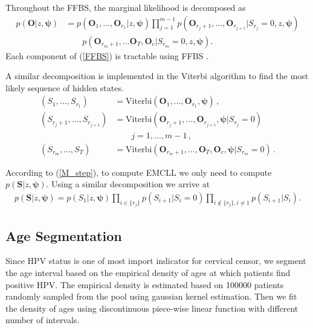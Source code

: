 \documentclass{article}
\begin{document}
Throughout the FFBS, the marginal likelihood is decomposed as
\begin{align}
p(\bm O |z, \bm \psi) & = p(\bm O_1, \ldots, \bm O_{r_1}| z, \bm \psi) \prod_{j = 1}^{m-1}p(\bm O_{r_j+1}, \ldots, \bm O_{r_{j+1}}| S_{r_j} = 0, z, \bm \psi) \nonumber \\
& \qquad p(\bm O_{r_m+1}, \ldots \bm O_T, \bm O_{c}| S_{r_m} = 0, z, \bm \psi). 
\label{FFBS}
\end{align}
Each component of (\ref{FFBS}) is tractable using FFBS \cite{Kitagawa_1987}.

A similar decomposition is implemented in the Viterbi algorithm to find the most likely sequence of hidden states.
\begin{align}
(S_1, \ldots, S_{r_1}) & = \mathrm{Viterbi}(\bm O_1, \ldots, \bm O_{r_1}, \bm \psi)\,, \nonumber \\
(S_{r_j+1}, \ldots, S_{r_{j+1}}) & = \mathrm{Viterbi}(\bm O_{r_j+1}, \ldots, \bm O_{r_{j+1}}, \bm \psi| S_{r_j} = 0)  \nonumber \\
& \qquad j = 1, \ldots, m-1\,,  \nonumber \\
(S_{r_m}, \ldots, S_{T}) & = \mathrm{Viterbi}(\bm O_{r_m+1}, \ldots, \bm O_{T}, \bm O_{c}, \bm \psi | S_{r_m} = 0) \,.
\end{align}

According to (\ref{M_step}), to compute EMCLL we only need to compute $p(\bm S| z, \bm{\psi})$. Using a similar decomposition we arrive at
\begin{eqnarray*}
	p(\bm S|z, \bm\psi) =  p(S_1|z, \bm \psi)\prod_{i \in \{r_j\}} p(S_{i+1}| S_i=0) \prod_{i \notin \{r_j\}, i \neq 1} p(S_{i+1}| S_i).
\end{eqnarray*}


\subsection{Age Segmentation} \label{sec:age}
Since HPV status is one of most import indicator for cervical censor, we segment the age interval based on the empirical density of ages at which patients find positive HPV. The empirical density is estimated based on 100000 patients randomly sampled from the pool using gaussian kernel estimation. Then we fit the density of ages using discontinuous piece-wise linear function with different number of intervals. 
\end{document}
